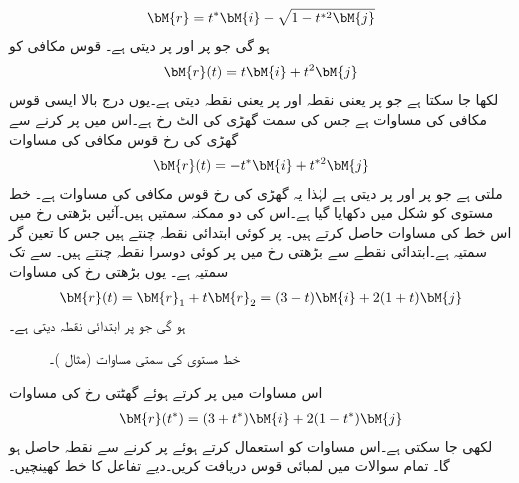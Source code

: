 \begin{align*}
\bM{r}=t^*\bM{i}-\sqrt{1-t^{*2}\bM{j}}
\end{align*}
ہو گی جو  پر  اور  پر  دیتی ہے۔
قوس مکافی  کو
\begin{align*}
\bM{r}(t)=t\bM{i}+t^2\bM{j}
\end{align*}
لکھا جا سکتا ہے جو  پر  یعنی نقطہ  اور  پر  یعنی نقطہ  دیتی ہے۔یوں درج بالا  ایسی قوس مکافی کی مساوات ہے جس کی سمت گھڑی کی الٹ رخ ہے۔اس میں  پر کرنے سے گھڑی کی رخ قوس مکافی کی مساوات 
\begin{align*}
\bM{r}(t)=-t^*\bM{i}+t^{*2}\bM{j}
\end{align*}
ملتی ہے جو  پر  اور  پر  دیتی ہے لہٰذا یہ گھڑی کی رخ قوس مکافی کی مساوات ہے۔
خط مستوی  کو شکل  میں دکھایا گیا ہے۔اس کی دو ممکنہ سمتیں ہیں۔آئیں بڑھتی  رخ میں اس خط کی  مساوات حاصل کرتے ہیں۔ پر کوئی ابتدائی نقطہ   چنتے ہیں جس کا  تعین گر سمتیہ   ہے۔ابتدائی نقطے سے بڑھتی  رخ میں  پر کوئی دوسرا نقطہ  چنتے ہیں۔ سے  تک سمتیہ  ہے۔ یوں بڑھتی  رخ  کی مساوات 
\begin{align*}
\bM{r}(t)=\bM{r}_1+t\bM{r}_2=(3-t)\bM{i}+2(1+t)\bM{j}
\end{align*}
 ہو گی جو  پر ابتدائی نقطہ  دیتی ہے۔
\begin{figure}
\centering
{}
\caption{خط مستوی کی سمتی مساوات (مثال )۔}
\label{شکل_مثال_الاحصاء_خط_مستوی_سمتی}
\end{figure}

اس مساوات میں  پر کرتے ہوئے گھٹتی  رخ  کی مساوات 
\begin{align*}
\bM{r}(t^*)=(3+t^*)\bM{i}+2(1-t^*)\bM{j}
\end{align*}
لکھی جا سکتی ہے۔اس مساوات کو استعمال کرتے ہوئے   پر کرنے سے نقطہ  حاصل ہو گا۔ 
تمام سوالات میں لمبائی قوس دریافت کریں۔دیے تفاعل کا خط کھینچیں۔

